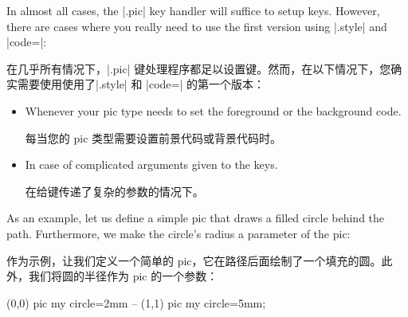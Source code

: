 In almost all cases, the |.pic| key handler will suffice to setup keys.
However, there are cases where you really need to use the first version using
|.style| and |code=|:

在几乎所有情况下，|.pic| 键处理程序都足以设置键。然而，在以下情况下，您确实需要使用使用了|.style| 和 |code=| 的第一个版本：
\begin{itemize}
    \item Whenever your pic type needs to set the foreground or the background
        code.

        每当您的 pic 类型需要设置前景代码或背景代码时。


    \item In case of complicated arguments given to the keys.

    在给键传递了复杂的参数的情况下。


\end{itemize}

As an example, let us define a simple pic that draws a filled circle behind the
path. Furthermore, we make the circle's radius a parameter of the pic:

作为示例，让我们定义一个简单的 pic，它在路径后面绘制了一个填充的圆。此外，我们将圆的半径作为 pic 的一个参数：


\begin{codeexample}[]
\tikz [fill=blue!30]
  \draw (0,0) pic {my circle=2mm} -- (1,1) pic {my circle=5mm};
\end{codeexample}
